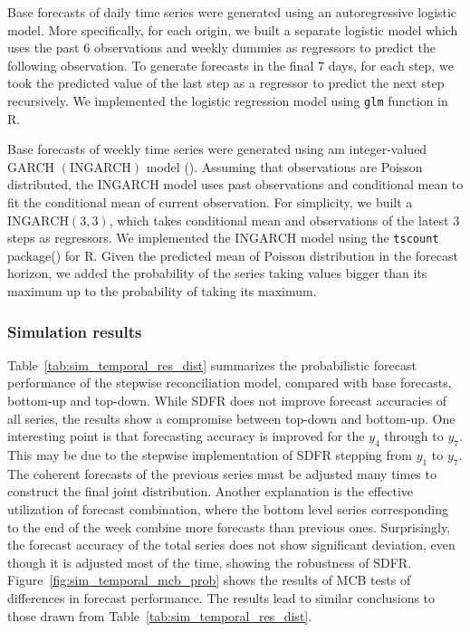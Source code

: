 \documentclass[a4paper,review,12pt,authoryear]{elsarticle}
\let\code=\texttt
\let\proglang=\textsf
\begin{document}
     Base forecasts of daily time series were generated using an autoregressive logistic model. 
     More specifically, for each origin, we built a separate logistic model which uses the past $6$ observations and weekly dummies as regressors to predict the following observation. 
     To generate forecasts in the final $7$ days, for each step, we took the predicted value of the last step as a regressor to predict the next step recursively. We implemented the logistic regression model using \code{glm} function in \proglang{R}.
     
     Base forecasts of weekly time series were generated using am integer-valued GARCH $(\textrm{INGARCH})$ model (). 
     Assuming that observations are Poisson distributed, the $\textrm{INGARCH}$ model uses past observations and conditional mean to fit the conditional mean of current observation.
     For simplicity, we built a $\textrm{INGARCH}(3, 3)$, which takes conditional mean and observations of the latest $3$ steps as regressors. 
     We implemented the $\textrm{INGARCH}$ model using the \code{tscount} package() for \proglang{R}.
     Given the predicted mean of Poisson distribution in the forecast horizon, we added the probability of the series taking values bigger than its maximum up to the probability of taking its maximum.
     
     \subsubsection{Simulation results}
     
     Table~\ref{tab:sim_temporal_res_dist} summarizes the probabilistic forecast performance of the stepwise reconciliation model, compared with base forecasts, bottom-up and top-down.
     While SDFR does not improve forecast accuracies of all series, the results
     show a compromise between top-down and bottom-up. 
     One interesting point is that forecasting accuracy is improved for the $y_4$ through to $y_7$. 
     This may be due to the stepwise implementation of SDFR stepping from $y_1$ to $y_7$. The coherent forecasts of the previous series must be adjusted many times to construct the final joint distribution.
     Another explanation is the effective utilization of forecast combination, where the bottom level series corresponding to the end of the week combine more forecasts than previous ones.
     Surprisingly, the forecast accuracy of the total series does not show significant deviation,  even though it is adjusted most of the time, showing the robustness of SDFR.
     Figure~\ref{fig:sim_temporal_mcb_prob} shows the results of MCB tests of differences in forecast performance. The results lead to similar conclusions to those drawn from Table~\ref{tab:sim_temporal_res_dist}. 
     
\end{document}
